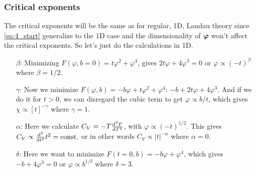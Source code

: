 \documentclass[11pt,letter, swedish, english
]{article}
\begin{document}




\subsubsection*{Critical exponents}
The critical exponents will be the same as for regular, 1D, Landau
theory since \eqref{eq:4_start} generalize to the 1D case and the
dimensionality of $\vb*\varphi$ won't affect the critical exponents. 
So let's just do the calculations in 1D\footnotemark{}.

\begin{itemize}
\item[$\beta$: ] Minimizing $F(\varphi, b=0)=t\varphi^2+\varphi^4$,
gives $2t\varphi+4\varphi^3=0$ or $\varphi\propto(-t)^{\beta}$ where $\beta=1/2$.
\item[$\gamma$: ] Now we minimize $F(\varphi,
b)=-b\varphi+t\varphi^2+\varphi^4$: $-b+2t\varphi+4\varphi^3$. And if
we do it for $t>0$, we can disregard the cubic term to get
$\varphi\propto b/t$, which gives $\chi\propto[t]^{-\gamma}$ where
$\gamma=1$.
\item[$\alpha$: ] Here we calculate $C_V=-T\dv[2]{F}{T}$, with
$\varphi\propto(-t)^{1/2}$. This gives
$C_V\propto\dv[2]{t}t^2=\text{const.}$ or in other words
$C_V\propto|t|^{-\alpha}$ where $\alpha=0$.
\item[$\delta$: ] Here we want to minimize $F(t=0,
b)=-b\varphi+\varphi^4$, which gives $-b+4\varphi^3=0$ or
$\varphi\propto b^{1/\delta}$ where $\delta=3$.
\end{itemize}
\end{document}
